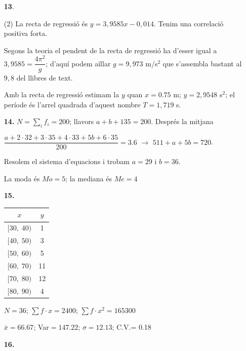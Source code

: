 \documentclass[a4paper, pdf, twoside]{book}
\begin{document}
\begin{multicols}{2}
\begin{enumerate}
 \item[\fontfamily{phv}\selectfont\color{blue}\textbf{13}. ] 
 \begin{tasks}[column-sep=1em, item-indent=1.3333em](2)
	 \task* La recta de regressió és $y=3,9585x-0,014$. Tenim una correlació positiva forta. \par {}
	 \task* Segons la teoria el pendent de la recta de regressió ha d'esser igual a $3,9585=\dfrac {4\pi ^2}{g}$; d'aquí podem aïllar $g=9,973$ m/s$^2$ que s'assembla bastant al $9,8$ del llibres de text.\par Amb la recta de regressió estimam la $y$ quan $x=0.75$ m; $y=2,9548$ s$^2$; el període és l'arrel quadrada d'aquest nombre $T=1,719$ s. 
\end{tasks}
 \end{enumerate}
\begin{enumerate}
\vspace{0.25cm}
\item[\fontfamily{phv}\selectfont\color{blue}\textbf{14. }] 
$N=\sum _i f_i=200$; llavors $a+b+135=200$. Després la mitjana\par $\dfrac {a+2\cdot 32 + 3 \cdot 35 + 4\cdot 33 + 5b+ 6\cdot 35}{200}=3.6$ $\rightarrow $ $511+a+5b=720$.\par Resolem el sistema d'equacions i trobam $a=29$ i $b=36$.\par La moda és $Mo=5$; la mediana és $Me=4$
\vspace{0.25cm}
\item[\fontfamily{phv}\selectfont\color{blue}\textbf{15. }] 
 \begin {tabular}{|c|c|}\hline \rowcolor {lightgray} $x$ & $y$ \\\hline $[30,\;40 )$ & 1\\ \hline $[40,\;50 )$ & 3\\ \hline $[50,\;60 )$ & 5\\ \hline $[60,\;70 )$ & 11\\ \hline $[70,\;80 )$ & 12\\ \hline $[80,\;90 )$ & 4\\ \hline \end {tabular} \par $N= 36 $; $\sum f\cdot x= 2400 $; $\sum f\cdot x^2= 165300 $ \par $\bar x= 66.67 $; Var$= 147.22 $; $\sigma = 12.13 $; C.V.= 0.18
\vspace{0.25cm}
\item[\fontfamily{phv}\selectfont\color{blue}\textbf{16. }] 

\end{enumerate}
\end{multicols}
\end{document}
